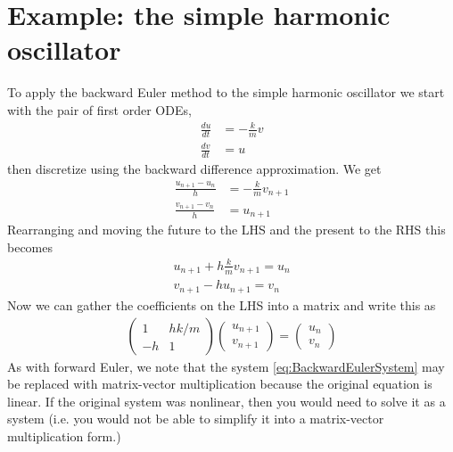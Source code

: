 \documentclass[hidelinks,notitlepage]{book}
\begin{document}
\section{Example: the simple harmonic oscillator}
To apply the backward Euler method to the simple harmonic oscillator we start with the pair of first order ODEs,
\begin{align}
\nonumber
\frac{d u}{d t} &= -\frac{k}{m} v  \\
\nonumber
\frac{d v}{d t} &= u
\end{align}
then discretize using the backward difference approximation.  We get
\begin{equation}
\label{eq:BackwardEulerSystem}
\begin{aligned}
\frac{u_{n+1} - u_{n}}{h} &= -\frac{k}{m} v_{n+1}  \\
\frac{v_{n+1} - v_{n}}{h} &= u_{n+1}
\end{aligned}
\end{equation}
Rearranging and moving the future to the LHS and the present to the RHS this becomes
\begin{align}
\nonumber
u_{n+1} + h \frac{k}{m} v_{n+1} = u_{n}  \\
\nonumber
v_{n+1} - h u_{n+1}= v_{n} 
\end{align}
Now we can gather the coefficients on the LHS into a matrix and write this as
\begin{align}
\nonumber
\begin{pmatrix}
1 & h k / m \\
-h & 1
\end{pmatrix}
\begin{pmatrix}
u_{n+1}  \\
v_{n+1} 
\end{pmatrix} = 
\begin{pmatrix}
u_{n}  \\
v_{n} 
\end{pmatrix}
\end{align}
As with forward Euler, we note that the system \cref{eq:BackwardEulerSystem} may be replaced with matrix-vector multiplication because the original equation is linear.  If the original system was nonlinear, then you would need to solve it as a system (i.e. you would not be able to simplify it into a matrix-vector multiplication form.)
\end{document}
